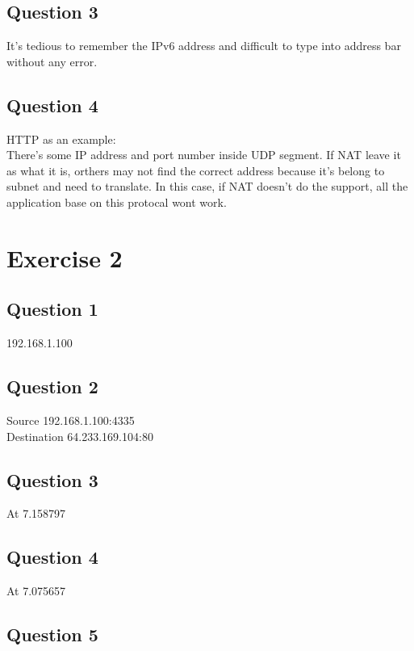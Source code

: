 \documentclass{article}
\begin{document}
\subsection{Question 3}

It's tedious to remember the IPv6 address and difficult to type into address bar without 
any error.

\subsection{Question 4}

HTTP as an example: \\
There's some IP address and port number inside UDP segment. If NAT leave it as what it is,
orthers may not find the correct address because it's belong to subnet and need to translate.
In this case, if NAT doesn't do the support, all the application base on this protocal wont
work.

\section{Exercise 2}

\subsection{Question 1}

192.168.1.100

\subsection{Question 2}

Source 192.168.1.100:4335\\
Destination  64.233.169.104:80

\subsection{Question 3}

At 7.158797

\subsection{Question 4}

At 7.075657

\subsection{Question 5}
\end{document}
